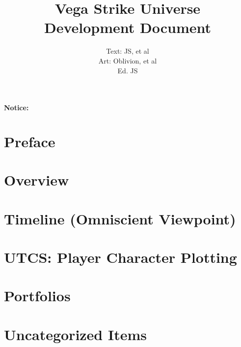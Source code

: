 

\title{Vega Strike Universe \\ 
Development Document}

\author{Text: JS, et al\\
Art: Oblivion, et al \\
Ed. JS}

\renewcommand{\thepage}{\roman{page}}
\maketitle
\renewcommand{\thepage}{\arabic{page}}
\thispagestyle{empty}
\centerline{\bf {\Huge Notice:}}
{\it

}

\setcounter{tocdepth}{2}
\clearpage
{}
\tableofcontents
\listoftables
{}
\listoffigures
{}

\chapter*{Preface}


\chapter{Overview}


\chapter{Timeline (Omniscient Viewpoint)}


\chapter{UTCS: Player Character Plotting}


\chapter{Portfolios}


\chapter{Uncategorized Items}



